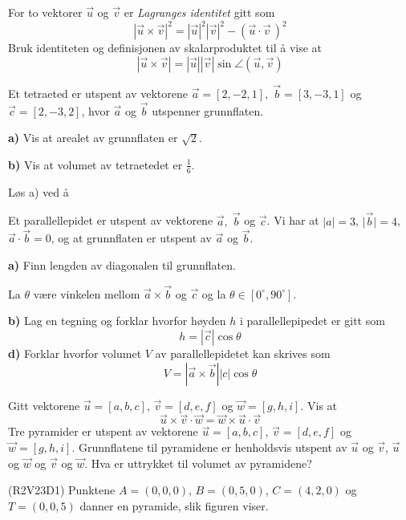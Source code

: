 For to vektorer $ \vec{u} $ og $ \vec{v} $ er \textit{Lagranges identitet} gitt som
\[ |\vec{u}\times\vec{v}|^2=|\vec{u}|^2|\vec{v}|^2-(\vec{u}\cdot\vec{v}\,)^2 \]
Bruk identiteten og definisjonen av skalarproduktet til å vise at
\[ |\vec{u}\times\vec{v}|=|\vec{u}||\vec{v}|\sin \angle(\vec{u}, \vec{v})  \]\vs

Et tetraeted er utspent av vektorene $ \vec{a}=[2, -2, 1],\; \vec{b}=[3, -3, 1] $ og $ \vec{c}=[2, -3, 2] $, hvor $ \vec{a} $ og $ \vec{b} $ utspenner grunnflaten.\os

\textbf{a)} Vis at arealet av grunnflaten er $ \sqrt{2} $.\os

\textbf{b)} Vis at volumet av tetraetedet er $ \frac{1}{6} $.
\newpage

Løs  a) ved å

Et parallellepidet er utspent av vektorene $ \vec{a},\; \vec{b} $ og $ \vec{c} $. Vi har at ${|a|=3}$,  $|{\vec{b}|=4}$, $ {\vec{a}\cdot \vec{b}=0}  $, og at grunnflaten er utspent av $ \vec{a} $ og $ \vec{b} $. \os

\textbf{a)} Finn lengden av diagonalen til grunnflaten.\os

La $ \theta $ være vinkelen mellom $ {\vec{a}\times\vec{b}} $ og $ \vec{c} $ og la $ {\theta\in[0^\circ, 90^\circ]} $.\os

\textbf{b)} Lag en tegning og forklar hvorfor høyden $ h $ i parallellepipedet er gitt som
\[ h= |\vec{c}|\cos \theta \]
\textbf{d)} Forklar hvorfor volumet $ V $ av parallellepidetet kan skrives som
\[ V= |\vec{a}\times\vec{b}||c|\cos \theta\]\vs

Gitt vektorene $ \vec{u}=[a, b, c] $, $ \vec{v}=[d, e, f] $ og $ \vec{w}=[g, h, i] $. Vis at
\[ \vec{u}\times\vec{v}\cdot\vec{w}= \vec{w}\times\vec{u}\cdot\vec{v}\]
Tre pyramider er utspent av vektorene $ \vec{u}=[a, b, c] $, $ \vec{v}=[d, e, f] $ og $ \vec{w}=[g, h, i] $. Grunnflatene til pyramidene er henholdsvis utspent av $ \vec{u} $ og $ \vec{v} $, $ \vec{u} $ og $ \vec{w} $ og $ \vec{v} $ og $ \vec{w} $. Hva er uttrykket til volumet av pyramidene?

\newpage
{}
(R2V23D1)\os
Punktene $ A=(0,0,0) $, $ B=(0,5,0) $, $ C=(4,2,0) $ og $ T=(0,0,5) $ danner en pyramide, slik figuren viser.


